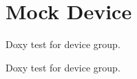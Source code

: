 \hypertarget{group__mockdevice}{\section{Mock Device}
\label{group__mockdevice}
}


Doxy test for device group.  


Doxy test for device group. 